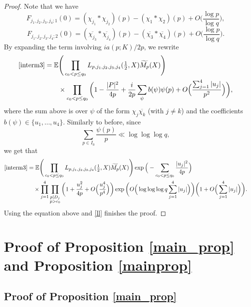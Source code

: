 \documentclass[12pt, reqno]{amsart}
\newcommand{\E}{\mathbb{E}}
\numberwithin{equation}{section}
\numberwithin{theorem}{section}
\numberwithin{equation}{section}
\begin{document}
\begin{proof}
   Note that we have 
   $$F_{j_1,j_2,j_3,j_4;1}(0) = (\chi_{j_1}*\chi_{j_2})(p)-(\chi_1*\chi_2)(p) + O \Big(  \frac{\log p}{\log q}\Big), $$
   $$F_{j_1,j_2,j_3,j_4;2}(0) = (\overline{\chi_{j_3}}*\overline{\chi_{j_4}})(p)-(\overline{\chi_3}*\overline{\chi_4})(p) + O \Big(  \frac{\log p}{\log q}\Big).$$
 By expanding the term involving $ia(p;K)/2p$, we rewrite 
 \begin{align*}
     \eqref{interm3} &= \E  \Bigg( \prod_{c_0<p \leq q_0} L_{p,j_1,j_2,j_3,j_4}( \tfrac{1}{2},X) \widetilde{M_p}(X)  \Bigg) \\
     &\qquad\times\prod_{c_0<p \leq q_0} \bigg( 1- \frac{|P|^2}{4p}+ \frac{i}{2p} \sum_{\psi} b(\psi) \psi(p)+ O \Big(  \frac{ \sum_{j=1}^4 |u_j|}{p^2}\Big) \bigg), 
 \end{align*}
   where the sum above is over $\psi$ of the form $\chi_j \overline{\chi_k}$ (with $j\neq k$) and the coefficients $b(\psi) \in \{u_1,\ldots,u_4\}.$
   Similarly to before, since
   $$ \sum_{p \in I_0} \frac{\psi(p)}{p} \ll \log \log \log q,$$ we get that 
   \begin{align*}
       \eqref{interm3}& = \E  \Bigg( \prod_{c_0<p \leq q_0} L_{p,j_1,j_2,j_3,j_4}( \tfrac{1}{2},X) \widetilde{M_p}(X)  \Bigg) \exp \Big( -\sum_{c_0 < p \leq q_0} \frac{|u_j|^2}{4p} \Big) \\
       &\quad \times \prod_{j=1}^4 \prod_{\substack{p|D_j \\ p >c_0}} \bigg(1+ \frac{u_j^2}{4p}+ O \Big( \frac{u_j^4}{p^4}\Big) \bigg)\exp \bigg( O \Big(  \log \log \log q \sum_{j=1}^4 |u_j|\Big) \bigg) \bigg(1 +O \Big(  \sum_{j=1}^4 |u_j|\Big) \bigg).
   \end{align*}
   Using the equation above and \eqref{ll} finishes the proof.
   \end{proof}


\section{Proof of Proposition \ref{main_prop} and Proposition \ref{mainprop}}  
\label{proofs}
\subsection{Proof of Proposition \ref{main_prop}}\label{proofmainprop}
\end{document}
